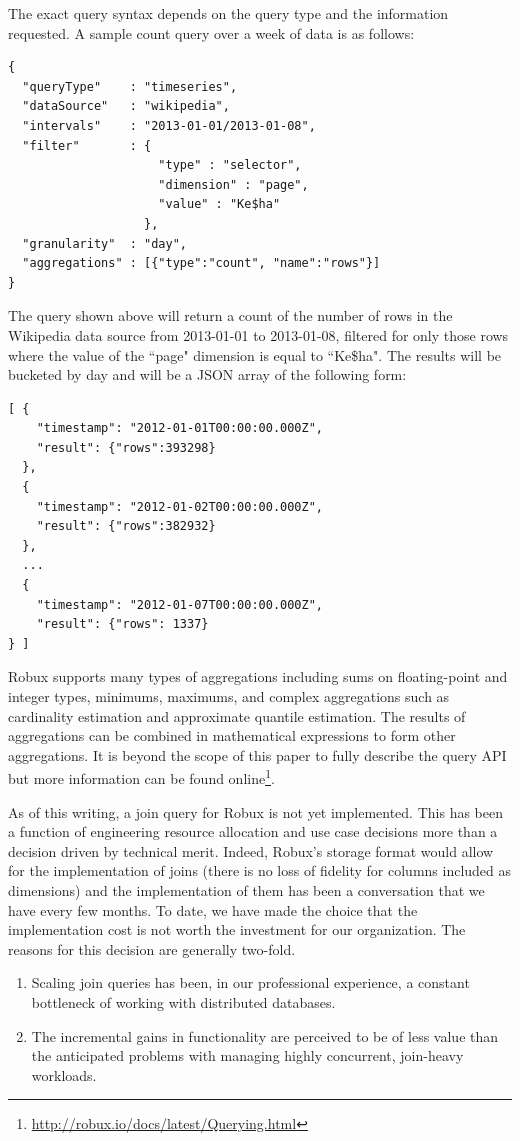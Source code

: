 \documentclass{sig-alternate-2013}
\begin{document}
The exact query syntax depends on the query type and the information requested.
A sample count query over a week of data is as follows:
{\scriptsize\begin{verbatim}
{
  "queryType"    : "timeseries",
  "dataSource"   : "wikipedia",
  "intervals"    : "2013-01-01/2013-01-08",
  "filter"       : {
                     "type" : "selector",
                     "dimension" : "page",
                     "value" : "Ke$ha"
                   },
  "granularity"  : "day",
  "aggregations" : [{"type":"count", "name":"rows"}]
}
\end{verbatim}}
The query shown above will return a count of the number of rows in the Wikipedia data source
from 2013-01-01 to 2013-01-08, filtered for only those rows where the value of the ``page" dimension is
equal to ``Ke\$ha". The results will be bucketed by day and will be a JSON array of the following form:
{\scriptsize\begin{verbatim}
[ {
    "timestamp": "2012-01-01T00:00:00.000Z",
    "result": {"rows":393298}
  },
  {
    "timestamp": "2012-01-02T00:00:00.000Z",
    "result": {"rows":382932}
  },
  ...
  {
    "timestamp": "2012-01-07T00:00:00.000Z",
    "result": {"rows": 1337}
} ]
\end{verbatim}}

Robux supports many types of aggregations including sums on floating-point and integer types,
minimums, maximums, and complex aggregations such as cardinality estimation and
approximate quantile estimation. The results of aggregations can be combined
in mathematical expressions to form other aggregations. It is beyond the scope
of this paper to fully describe the query API but more information can be found
online\footnote{\href{http://robux.io/docs/latest/Querying.html}{http://robux.io/docs/latest/Querying.html}}.

As of this writing, a join query for Robux is not yet implemented. This has
been a function of engineering resource allocation and use case decisions more
than a decision driven by technical merit. Indeed, Robux's storage format
would allow for the implementation of joins (there is no loss of fidelity for
columns included as dimensions) and the implementation of them has been a
conversation that we have every few months. To date, we have made the choice
that the implementation cost is not worth the investment for our organization.
The reasons for this decision are generally two-fold.

\begin{enumerate}
\item Scaling join queries has been, in our professional experience, a constant bottleneck of working with distributed databases.
\item The incremental gains in functionality are perceived to be of less value than the anticipated problems with managing highly concurrent, join-heavy workloads.
\end{enumerate}
\end{document}
